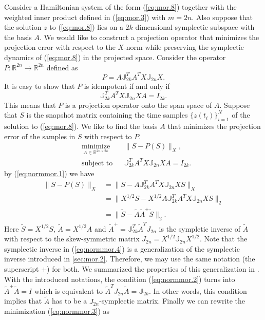Consider a Hamiltonian system of the form (\ref{eq:mor.8}) together with the weighted inner product defined in (\ref{eq:mor.3}) with $m=2n$. Also suppose that the solution $z$ to (\ref{eq:mor.8}) lies on a $2k$ dimensional symplectic subspace with the basis $A$. We would like to construct a projection operator that minimizes the projection error with respect to the $X$-norm while preserving the symplectic dynamics of (\ref{eq:mor.8}) in the projected space. Consider the operator $P: \mathbb R^{2n} \to \mathbb R^{2n}$ defined as
\begin{equation} \label{eq:normmor.1}
	P = A \mathbb J_{2k}^T A^T X \mathbb J_{2n} X.
\end{equation}
It is easy to show that $P$ is idempotent if and only if
\begin{equation} \label{eq:normmor.2}
	\mathbb J_{2k}^T A^T X \mathbb J_{2n} X A = I_{2k}.
\end{equation}
This means that $P$ is a projection operator onto the span space of $A$. Suppose that $S$ is the snapshot matrix containing the time samples $\{z(t_i)\}_{i=1}^N$ of the solution to (\ref{eq:mor.8}). We like to find the basis $A$ that minimizes the projection error of the samples in $S$ with respect to $P$.
\begin{equation} \label{eq:normmor.3}
\begin{aligned}
& \underset{A\in \mathbb{R}^{2n\times 2k}}{\text{minimize}}
& & \| S - P(S) \|_X, \\
& \text{subject to}
& & \mathbb J_{2k}^T A^T X \mathbb J_{2n} X A = I_{2k}.
\end{aligned}
\end{equation}
by (\ref{eq:normmor.1}) we have
\begin{equation} \label{eq:normmor.4}
\begin{aligned}
	\| S - P(S) \|_X &= \| S - A \mathbb J_{2k}^T A^T X \mathbb J_{2n} X S \|_X \\
	&= \| X^{1/2} S - X^{1/2} A \mathbb J_{2k}^T A^T X \mathbb J_{2n} X S \|_2 \\
	&= \| \tilde S - \tilde A \tilde A ^+ \tilde S \|_2.
\end{aligned}
\end{equation}
Here $\tilde S = X^{1/2} S$, $\tilde A = X^{1/2} A$ and $\tilde A^+ = \mathbb J_{2k}^T \tilde A^T J_{2n}$ is the sympletic inverse of $\tilde A$ with respect to the skew-symmetric matrix $J_{2n} = X^{1/2} \mathbb J_{2n} X^{1/2}$. Note that the symplectic inverse in (\ref{eq:normmor.4}) is a generalization of the symplectic inverse introduced in \cref{sec:mor.2}. Therefore, we may use the same notation (the superscript $+$) for both. We summarized the properties of this generalization in . With the introduced notations, the condition (\ref{eq:normmor.2}) turns into $\tilde A ^+ \tilde A = I$ which is equivalent to $\tilde A ^T J_{2n} \tilde A = \mathbb J_{2k}$. In other words, this condition implies that $\tilde A$ has to be a $J_{2n}$-symplectic matrix. Finally we can rewrite the minimization (\ref{eq:normmor.3}) as

